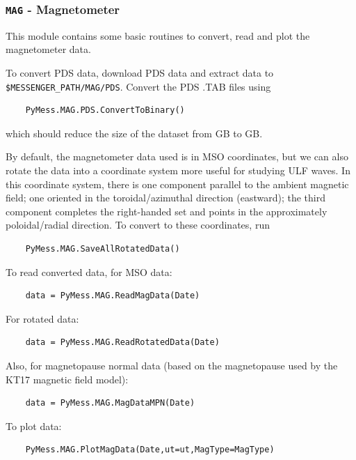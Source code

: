 	\subsubsection{\texttt{MAG} - Magnetometer}
	
	This module contains some basic routines to convert, read and plot the
	magnetometer data.
	
	To convert PDS data, download PDS data and extract data to \texttt{\$MESSENGER\_PATH/MAG/PDS}.
	Convert the PDS .TAB files using
	
	\begin{verbatim}
	PyMess.MAG.PDS.ConvertToBinary()
	\end{verbatim}
	
	which should reduce the size of the dataset from GB to GB.
	
	By default, the magnetometer data used is in MSO coordinates, but we can
	also rotate the data into a coordinate system more useful for studying 
	ULF waves. In this coordinate system, there is one component parallel to 
	the ambient magnetic field; one oriented in the toroidal/azimuthal 
	direction (eastward); the third component completes the right-handed set 
	and points in the approximately poloidal/radial direction. To convert to
	these coordinates, run
	
	\begin{verbatim}
	PyMess.MAG.SaveAllRotatedData()
	\end{verbatim}
	
	To read converted data, for MSO data:
	
	\begin{verbatim}
	data = PyMess.MAG.ReadMagData(Date)
	\end{verbatim}
	
	For rotated data:
	
	\begin{verbatim}
	data = PyMess.MAG.ReadRotatedData(Date)
	\end{verbatim}
	
	Also, for magnetopause normal data (based on the magnetopause used by
	the KT17 magnetic field model):
	
	\begin{verbatim}
	data = PyMess.MAG.MagDataMPN(Date)
	\end{verbatim}
	
	To plot data:
	
	\begin{verbatim}
	PyMess.MAG.PlotMagData(Date,ut=ut,MagType=MagType)
	\end{verbatim}
	

